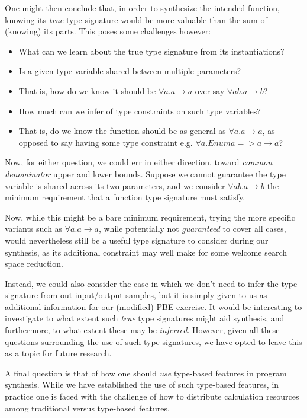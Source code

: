 \documentclass{article}
\begin{document}
    One might then conclude that, in order to synthesize the intended function,
    knowing its \emph{true} type signature would be more valuable than the sum of (knowing) its parts.
    This poses some challenges however:

    \begin{itemize}
        \item What can we learn about the true type signature from its instantiations?
        \item Is a given type variable shared between multiple parameters?
        \item That is, how do we know it should be $\forall a . a \rightarrow a$ over say $\forall a b . a \rightarrow b$?
        \item How much can we infer of type constraints on such type variables?
        \item That is, do we know the function should be as general as $\forall a . a \rightarrow a$, as opposed to say having some type constraint e.g. $\forall a . Enum a => a \rightarrow a$?
    \end{itemize}

    Now, for either question, we could err in either direction, toward \emph{common denominator} upper and lower bounds.
    Suppose we cannot guarantee the type variable is shared across its two parameters,
    and we consider $\forall a b . a \rightarrow b$ the minimum requirement that a function type signature must satisfy.

    Now, while this might be a bare minimum requirement,
    trying the more specific variants such as $\forall a . a \rightarrow a$,
    while potentially not \emph{guaranteed} to cover all cases,
    would nevertheless still be a useful type signature to consider during our synthesis,
    as its additional constraint may well make for some welcome search space reduction.

    Instead, we could also consider the case in which we don't need to infer the type signature from out input/output samples,
    but it is simply given to us as additional information for our (modified) PBE exercise.
    It would be interesting to investigate to what extent such \emph{true} type signatures
    might aid synthesis, and furthermore, to what extent these may be \emph{inferred}.
    However, given all these questions surrounding the use of such type signatures,
    we have opted to leave this as a topic for future research.

    A final question is that of how one should \emph{use} type-based features in program synthesis.
    While we have established the use of such type-based features,
    in practice one is faced with the challenge of how to distribute calculation resources among traditional versus type-based features.
\end{document}

